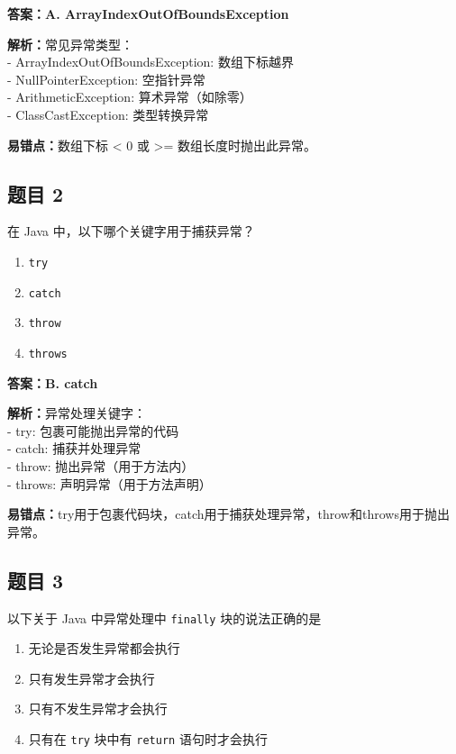 \documentclass[12pt,a4paper]{ctexart}
\begin{document}
\begin{answerbox}
	\textbf{答案：A. ArrayIndexOutOfBoundsException}

	\textbf{解析：}常见异常类型：\\
	- ArrayIndexOutOfBoundsException: 数组下标越界\\
	- NullPointerException: 空指针异常\\
	- ArithmeticException: 算术异常（如除零）\\
	- ClassCastException: 类型转换异常

	\textbf{易错点：}数组下标 < 0 或 >= 数组长度时抛出此异常。
\end{answerbox}

\subsection*{题目 2}
在 Java 中，以下哪个关键字用于捕获异常？
\begin{enumerate}[label=\Alph*.]
	\item \texttt{try}
	\item \texttt{catch}
	\item \texttt{throw}
	\item \texttt{throws}
\end{enumerate}

\begin{answerbox}
	\textbf{答案：B. catch}

	\textbf{解析：}异常处理关键字：\\
	- try: 包裹可能抛出异常的代码\\
	- catch: 捕获并处理异常\\
	- throw: 抛出异常（用于方法内）\\
	- throws: 声明异常（用于方法声明）

	\textbf{易错点：}try用于包裹代码块，catch用于捕获处理异常，throw和throws用于抛出异常。
\end{answerbox}

\subsection*{题目 3}
以下关于 Java 中异常处理中 \texttt{finally} 块的说法正确的是
\begin{enumerate}[label=\Alph*.]
	\item 无论是否发生异常都会执行
	\item 只有发生异常才会执行
	\item 只有不发生异常才会执行
	\item 只有在 \texttt{try} 块中有 \texttt{return} 语句时才会执行
\end{enumerate}
\end{document}
